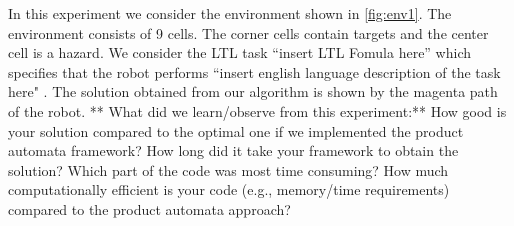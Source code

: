 \documentclass[letter paper, 10 pt, conference]{ieeeconf}
\begin{document}
In this experiment we consider the environment shown in \ref{fig:env1}.
The environment consists of 9 cells. The corner cells contain targets and the center cell is a hazard.
We consider the LTL task ``insert LTL Fomula here'' which specifies that the robot performs ``insert english language description of the task here" .
The solution obtained from our algorithm is shown by the magenta path of the robot.
** What did we learn/observe from this experiment:**
How good is your solution compared to the optimal one if we implemented the product automata framework?
How long did it take your framework to obtain the solution?
Which part of the code was most time consuming?
How much computationally efficient is your code  (e.g., memory/time requirements) compared to the product automata approach?


% 
\end{document}
